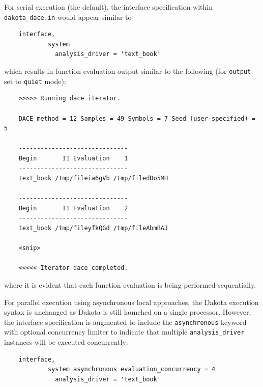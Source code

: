 For serial execution (the default), the interface specification within
\texttt{dakota\_dace.in} would appear similar to
\begin{small}
\begin{verbatim}
    interface,
            system
              analysis_driver = 'text_book'
\end{verbatim}
\end{small}

which results in function evaluation output similar to the following
(for \texttt{output} set to \texttt{quiet} mode):
\begin{small}
\begin{verbatim}
    >>>>> Running dace iterator.
    
    DACE method = 12 Samples = 49 Symbols = 7 Seed (user-specified) = 5
    
    ------------------------------
    Begin       I1 Evaluation    1
    ------------------------------
    text_book /tmp/fileia6gVb /tmp/filedDo5MH
    
    ------------------------------
    Begin       I1 Evaluation    2
    ------------------------------
    text_book /tmp/fileyfkQGd /tmp/fileAbmBAJ
    
    <snip>
    
    <<<<< Iterator dace completed.
\end{verbatim}
\end{small}
where it is evident that each function evaluation is being performed
sequentially.

For parallel execution using asynchronous local approaches, the Dakota
execution syntax is unchanged as Dakota is still launched on a single
processor.  However, the interface specification is augmented to
include the \texttt{asynchronous} keyword with optional concurrency
limiter to indicate that multiple \texttt{analysis\_driver} instances
will be executed concurrently:
\begin{small}
\begin{verbatim}
    interface,
            system asynchronous evaluation_concurrency = 4
              analysis_driver = 'text_book'
\end{verbatim}
\end{small}

